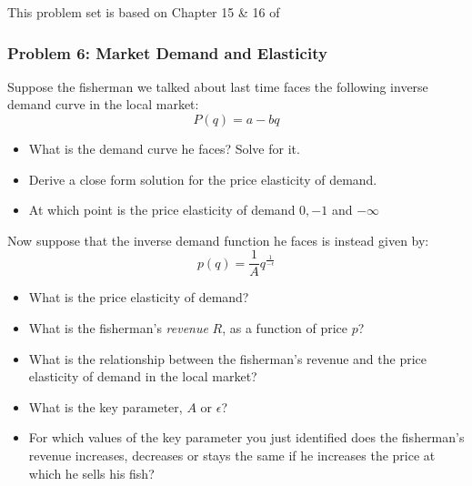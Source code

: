 \documentclass{article}
\begin{document}
This problem set is based on Chapter 15 \& 16 of \cite{Valrian_Inter_Micro}

\subsubsection*{Problem 6: Market Demand and Elasticity}
Suppose the fisherman we talked about last time faces the following inverse
demand curve in the local market:
\begin{equation*}
  P(q) = a-bq
\end{equation*}
\begin{itemize}
  \item What is the demand curve he faces? Solve for it.
  \item Derive a close form solution for the price elasticity of demand.
  \item At which point is the price elasticity of demand \(0, -1\) and \(-\infty\)
\end{itemize}
Now suppose that the inverse demand function he faces is instead given by:
\begin{equation*}
  p(q) = \frac{1}{A}q^{\frac{1}{-\epsilon}}
\end{equation*}
\begin{itemize}
  \item What is the price elasticity of demand?
  \item What is the fisherman's \textit{revenue} \(R\), as a function of price \(p\)?
  \item What is the relationship between the fisherman's revenue and the price
  elasticity of demand in the local market?
  \item What is the key parameter, \(A\) or \(\epsilon\)?
  \item For which values of the key parameter you just identified does the fisherman's
  revenue increases, decreases or stays the same if he increases the price at which
  he sells his fish?
\end{itemize}

 \newpage
\end{document}
